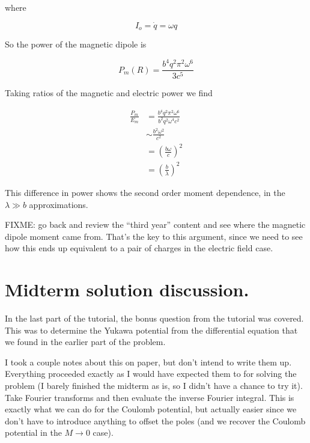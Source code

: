 where 

\begin{equation}\label{eqn:relativisticElectrodynamicsT8:310}
I_o = \dot{q} = \omega q
\end{equation}

So the power of the magnetic dipole is 

\begin{equation}\label{eqn:relativisticElectrodynamicsT8:330}
P_m(R) = \frac{b^4 q^2 \pi^2 \omega^6}{3 c^5}
\end{equation}

Taking ratios of the magnetic and electric power we find

\begin{align*}
\frac{P_m}{E_m} 
&= \frac{b^4 q^2 \pi^2 \omega^6}{b^2 q^2 \omega^4 c^2}  \\
&\sim \frac{b^2 \omega^2}{c^2} \\
&= \left(\frac{b \omega}{c}\right)^2 \\
&= \left(\frac{b }{\lambda}\right)^2 
\end{align*}

This difference in power shows the second order moment dependence, in the $\lambda \gg b$ approximations.

FIXME: go back and review the ``third year'' content and see where the magnetic dipole moment came from.  That's the key to this argument, since we need to see how this ends up equivalent to a pair of charges in the electric field case.

\section{Midterm solution discussion.}

In the last part of the tutorial, the bonus question from the tutorial was covered.  This was to determine the Yukawa potential from the differential equation that we found in the earlier part of the problem.

I took a couple notes about this on paper, but don't intend to write them up.  Everything proceeded exactly as I would have expected them to for solving the problem (I barely finished the midterm as is, so I didn't have a chance to try it).  Take Fourier transforms and then evaluate the inverse Fourier integral.  This is exactly what we can do for the Coulomb potential, but actually easier since we don't have to introduce anything to offset the poles (and we recover the Coulomb potential in the $M \rightarrow 0$ case).

\EndNoBibArticle
